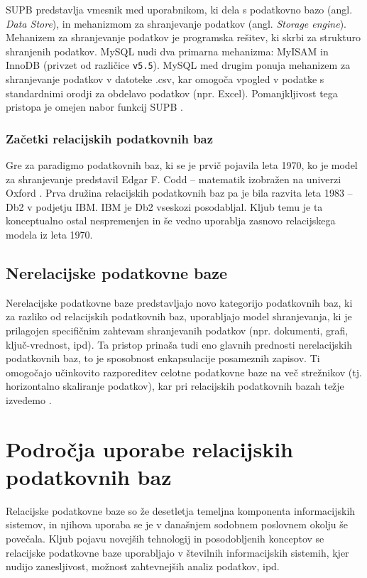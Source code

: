\documentclass[a4paper,12pt,openright]{book}
\begin{document}
        SUPB predstavlja vmesnik med uporabnikom, ki dela s podatkovno bazo (angl. \textit{Data Store}), in mehanizmom za shranjevanje podatkov (angl. \textit{Storage engine}). Mehanizem za shranjevanje podatkov je programska rešitev, ki skrbi za strukturo shranjenih podatkov. MySQL nudi dva primarna mehanizma: MyISAM in InnoDB (privzet od različice {\tt v5.5}). MySQL med drugim ponuja mehanizem za shranjevanje podatkov v datoteke .csv, kar omogoča vpogled v podatke s standardnimi orodji za obdelavo podatkov (npr. Excel). Pomanjkljivost tega pristopa je omejen nabor funkcij SUPB \cite{MYSQL_SE}.

        \subsubsection{Začetki relacijskih podatkovnih baz}
        Gre za paradigmo podatkovnih baz, ki se je prvič pojavila leta 1970, ko je model za shranjevanje predstavil Edgar F. Codd – matematik izobražen na univerzi Oxford \cite{IBM_SUPB_1970}. Prva družina relacijskih podatkovnih baz pa je bila razvita leta 1983 – Db2 \cite{DB2} v podjetju IBM. IBM je Db2 vseskozi posodabljal. Kljub temu je ta konceptualno ostal nespremenjen in še vedno uporablja zasnovo relacijskega modela iz leta 1970.
        
        \subsection{Nerelacijske podatkovne baze}
        Nerelacijske podatkovne baze predstavljajo novo kategorijo podatkovnih baz, ki za razliko od relacijskih podatkovnih baz,  uporabljajo model shranjevanja, ki je prilagojen specifičnim zahtevam shranjevanih podatkov (npr. dokumenti, grafi, ključ-vrednost, ipd). Ta pristop prinaša tudi eno glavnih prednosti nerelacijskih podatkovnih baz, to je sposobnost enkapsulacije posameznih zapisov. Ti omogočajo učinkovito razporeditev celotne podatkovne baze na več strežnikov (tj. horizontalno skaliranje podatkov), kar pri relacijskih podatkovnih bazah težje izvedemo \cite{pokorny2011nosql}.
    
    \section{Področja uporabe relacijskih podatkovnih baz}

    Relacijske podatkovne baze so že desetletja temeljna komponenta informacijskih sistemov, in njihova uporaba se je v današnjem sodobnem poslovnem okolju še povečala. Kljub pojavu novejših tehnologij in posodobljenih konceptov se relacijske podatkovne baze uporabljajo v številnih informacijskih sistemih, kjer nudijo zanesljivost, možnost zahtevnejših analiz podatkov, ipd.
\end{document}
